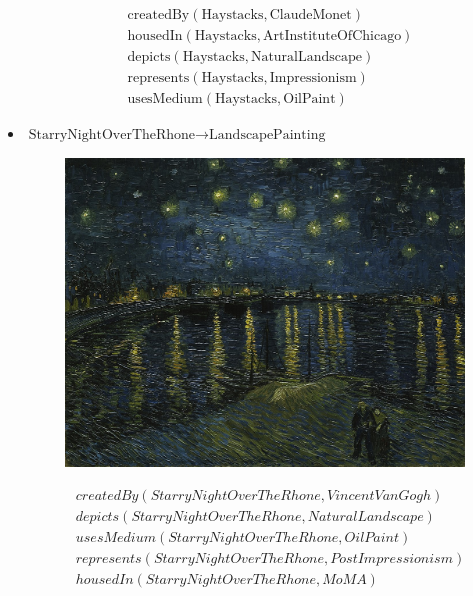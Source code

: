 \documentclass{article}
\begin{document}
\begin{itemize}
\begin{figure}[H]
    \end{figure}
    \begin{align*}
      &\text{createdBy}(\text{Haystacks}, \text{ClaudeMonet})\\
      &\text{housedIn}(\text{Haystacks}, \text{ArtInstituteOfChicago})\\
      &\text{depicts}(\text{Haystacks}, \text{NaturalLandscape})\\
      &\text{represents}(\text{Haystacks}, \text{Impressionism})\\
      &\text{usesMedium}(\text{Haystacks}, \text{OilPaint})
    \end{align*}
  \item $\text{StarryNightOverTheRhone} \to \text{LandscapePainting}$
    \begin{figure}[H]
      \centering
      \includegraphics[width=\linewidth]{images/starrynightovertherhone.jpg}
    \end{figure}
    \begin{align*}
      &createdBy(StarryNightOverTheRhone, VincentVanGogh)\\
      &depicts(StarryNightOverTheRhone, NaturalLandscape)\\
      &usesMedium(StarryNightOverTheRhone, OilPaint)\\
      &represents(StarryNightOverTheRhone, PostImpressionism)\\
      &housedIn(StarryNightOverTheRhone, MoMA)
    \end{align*}
\end{itemize}
\end{document}
